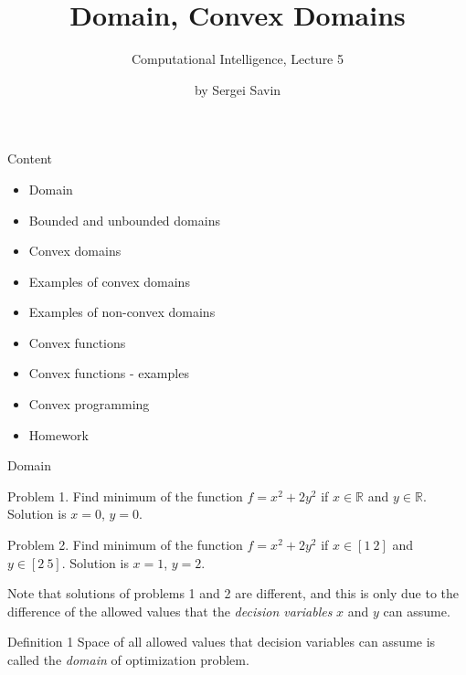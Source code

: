 \documentclass{beamer}
\title{Domain, Convex Domains}
\subtitle{Computational Intelligence, Lecture 5}
\author{by Sergei Savin}
\date{\mydate}
\begin{document}
\maketitle


\begin{frame}{Content}

\begin{itemize}
\item Domain
\item Bounded and unbounded domains
\item Convex domains
\item Examples of convex domains
\item Examples of non-convex domains
\item Convex functions
\item Convex functions - examples
\item Convex programming
\item Homework
\end{itemize}

\end{frame}



\begin{frame}{Domain}
\begin{flushleft}

Problem 1. Find minimum of the function $f = x^2 + 2y^2$ if $x \in \mathbb{R}$ and $y \in \mathbb{R}$. Solution is $x = 0$, $y = 0$.

\bigskip

Problem 2. Find minimum of the function $f = x^2 + 2y^2$ if $x \in [1 \ 2]$ and $y \in [2 \ 5]$. Solution is $x = 1$, $y = 2$.

\bigskip

Note that solutions of problems 1 and 2 are different, and this is only due to the difference of the allowed values that the \emph{decision variables} $x$ and $y$ can assume.

\begin{block}{Definition 1}
Space of all allowed values that decision variables can assume is called the \emph{domain} of optimization problem.
\end{block}
 
\end{flushleft}
\end{frame}
\end{document}
